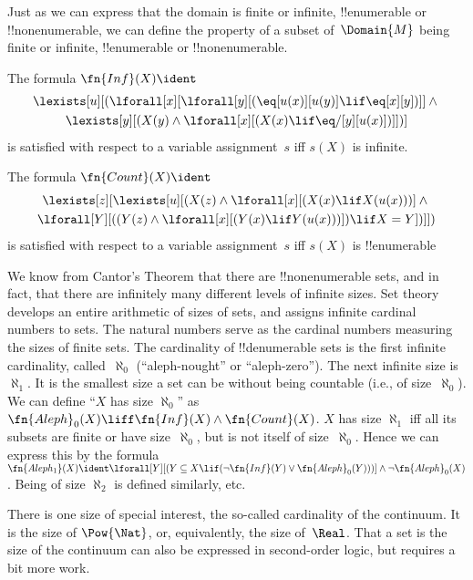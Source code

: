 \documentclass[../../../include/open-logic-section]{subfiles}
\begin{document}


\begin{explain}
Just as we can express that the domain is finite or infinite,
!!{enumerable} or !!{nonenumerable}, we can define the property of a
subset of~$\Domain{M}$ being finite or infinite, !!{enumerable} or
!!{nonenumerable}.
\end{explain}

\begin{prop}
The formula $\fn{Inf}(X) \ident$
\begin{multline*}
\lexists[u][(\lforall[x][\lforall[y][(\eq[u(x)][u(y)] \lif 
      \eq[x][y])]] \land {} \\\lexists[y][(X(y) \land \lforall[x][(X(x)
      \lif \eq/[y][u(x)])]])]
\end{multline*}
is satisfied with respect to a variable assignment~$s$ iff $s(X)$ is
infinite.
\end{prop}

\begin{prop}
The formula $\fn{Count}(X) \ident $
\begin{multline*}
\lexists[z][\lexists[u][(X(z) \land 
    \lforall[x][(X(x) \lif X(u(x)))] \land {} \\ \lforall[Y][((Y(z) \land
      \lforall[x][(Y(x) \lif Y(u(x)))]) \lif X = Y])]])
\end{multline*}
is satisfied with respect to a variable assignment~$s$ iff $s(X)$ is
!!{enumerable}
\end{prop}

We know from Cantor's Theorem that there are !!{nonenumerable} sets,
and in fact, that there are infinitely many different levels of
infinite sizes.  Set theory develops an entire arithmetic of sizes of
sets, and assigns infinite cardinal numbers to sets.  The natural
numbers serve as the cardinal numbers measuring the sizes of finite
sets. The cardinality of !!{denumerable} sets is the first infinite
cardinality, called~$\aleph_0$ (``aleph-nought'' or
``aleph-zero''). The next infinite size is~$\aleph_1$. It is the
smallest size a set can be without being countable (i.e., of
size~$\aleph_0$).  We can define ``$X$ has size $\aleph_0$'' as
$\fn{Aleph}_0(X) \liff \fn{Inf}(X) \land \fn{Count}(X)$.  $X$ has size
$\aleph_1$ iff all its subsets are finite or have size~$\aleph_0$, but
is not itself of size~$\aleph_0$. Hence we can express this by the
formula $\fn{Aleph_1}(X) \ident \lforall[Y][(Y \subseteq X \lif
  (\lnot\fn{Inf}(Y) \lor \fn{Aleph}_0(Y)))] \land \lnot
\fn{Aleph}_0(X)$. Being of size $\aleph_2$ is defined similarly, etc.

There is one size of special interest, the so-called cardinality of
the continuum.  It is the size of $\Pow{\Nat}$, or, equivalently, the
size of~$\Real$. That a set is the size of the continuum can also be
expressed in second-order logic, but requires a bit more work.
\end{document}
